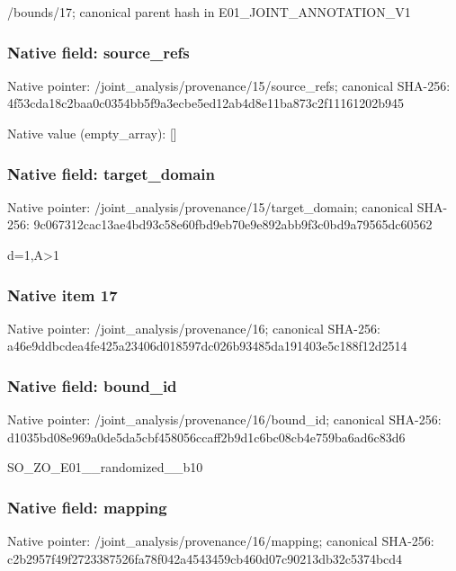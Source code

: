\documentclass[10pt,a4paper]{article}
\begin{document}
\begingroup\raggedright\sloppy /\allowbreak{}bounds/\allowbreak{}17;\allowbreak{} canonical parent hash in E01\_\allowbreak{}JOINT\_\allowbreak{}ANNOTATION\_\allowbreak{}V1\par\endgroup

\subsubsection{Native field: source\_\allowbreak{}refs}
Native pointer: /joint\_\allowbreak{}analysis/provenance/15/source\_\allowbreak{}refs; canonical SHA-256: 4f53cda18c2baa0c0354bb5f9a3ecbe5ed12ab4d8e11ba873c2f11161202b945

Native value (empty\_\allowbreak{}array): []

\subsubsection{Native field: target\_\allowbreak{}domain}
Native pointer: /joint\_\allowbreak{}analysis/provenance/15/target\_\allowbreak{}domain; canonical SHA-256: 9c067312cac13ae4bd93c58e60fbd9eb70e9e892abb9f3c0bd9a79565dc60562

\begingroup\raggedright\sloppy d=\allowbreak{}1,\allowbreak{}A>1\par\endgroup

\subsubsection{Native item 17}
Native pointer: /joint\_\allowbreak{}analysis/provenance/16; canonical SHA-256: a46e9ddbcdea4fe425a23406d018597dc026b93485da191403e5c188f12d2514

\subsubsection{Native field: bound\_\allowbreak{}id}
Native pointer: /joint\_\allowbreak{}analysis/provenance/16/bound\_\allowbreak{}id; canonical SHA-256: d1035bd08e969a0de5da5cbf458056ccaff2b9d1c6bc08cb4e759ba6ad6c83d6

\begingroup\raggedright\sloppy SO\_\allowbreak{}ZO\_\allowbreak{}E01\_\allowbreak{}\_\allowbreak{}randomized\_\allowbreak{}\_\allowbreak{}b10\par\endgroup

\subsubsection{Native field: mapping}
Native pointer: /joint\_\allowbreak{}analysis/provenance/16/mapping; canonical SHA-256: c2b2957f49f2723387526fa78f042a4543459cb460d07c90213db32c5374bcd4
\end{document}
